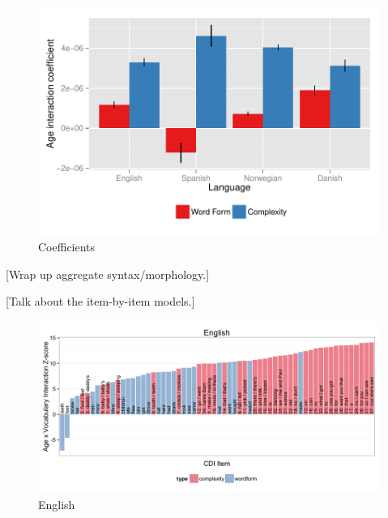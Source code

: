 \documentclass[10pt,letterpaper]{article}
\begin{document}
\begin{figure}[hbtp]
\begin{center}
\includegraphics[width=\linewidth]{plots/coeffs}
\end{center}
\caption{Coefficients} 
\label{coeffs}
\end{figure}

[Wrap up aggregate syntax/morphology.]

\clearpage

[Talk about the item-by-item models.]

\begin{figure}[h]
\begin{center}
\includegraphics[width=\linewidth]{plots/english_interactions}
\end{center}
\caption{English} 
\label{english_interactions}
\end{figure}
\end{document}
